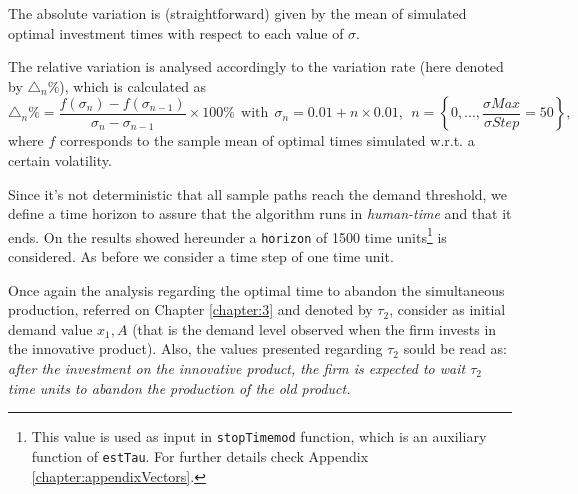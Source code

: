 
The absolute variation is (straightforward) given by the mean of simulated optimal investment times with respect to each value of $\sigma$.

The relative variation is analysed accordingly to the variation rate (here denoted by $\triangle_n \% $), which is calculated as
\begin{equation}
\triangle_n \% = \frac{f(\sigma_n)-f(\sigma_{n-1})}{\sigma_n-\sigma_{n-1}} \times 100 \% \  \ \text{with} \ \ \sigma_n=0.01+n\times0.01, \ \ n=\left\lbrace 0,..., \frac{\sigma Max}{\sigma Step}=50 \right\rbrace,
\label{var}
\end{equation}
where $f$ corresponds to the sample mean of optimal times simulated w.r.t. a certain volatility.

Since it's not deterministic that all sample paths reach the demand threshold, we define a time horizon to assure that the algorithm runs in \textit{human-time} and that it ends. On the results showed hereunder a \texttt{horizon} of 1500 time units\footnote{This value is used as input in \texttt{stopTimemod} function, which is an auxiliary function of \texttt{estTau}. For further details check Appendix \ref{chapter:appendixVectors}.} is considered. As before we consider a time step of one time unit.

Once again the analysis regarding the optimal time to abandon the simultaneous production, referred on Chapter \ref{chapter:3} and denoted by $\tau_2$, consider as initial demand value $x_1,A$ (that is the demand level observed when the firm invests in the innovative product). Also, the values presented regarding $\tau_2$ sould be read as: \textit{after the investment on the innovative product, the firm is expected to wait $\tau_2$ time units to abandon the production of the old product.}




